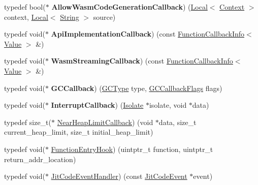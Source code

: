 \begin{DoxyCompactItemize}
typedef bool($\ast$ {\bfseries Allow\+Wasm\+Code\+Generation\+Callback}) (\mbox{\hyperlink{classv8_1_1Local}{Local}}$<$ \mbox{\hyperlink{classv8_1_1Context}{Context}} $>$ context, \mbox{\hyperlink{classv8_1_1Local}{Local}}$<$ \mbox{\hyperlink{classv8_1_1String}{String}} $>$ source)
\item 
\mbox{\label{namespacev8_aba0496b8f6f90db40d84055f2ee37733}} 
typedef void($\ast$ {\bfseries Api\+Implementation\+Callback}) (const \mbox{\hyperlink{classv8_1_1FunctionCallbackInfo}{Function\+Callback\+Info}}$<$ \mbox{\hyperlink{classv8_1_1Value}{Value}} $>$ \&)
\item 
\mbox{\label{namespacev8_a6354789576235038d53c101c866af3c1}} 
typedef void($\ast$ {\bfseries Wasm\+Streaming\+Callback}) (const \mbox{\hyperlink{classv8_1_1FunctionCallbackInfo}{Function\+Callback\+Info}}$<$ \mbox{\hyperlink{classv8_1_1Value}{Value}} $>$ \&)
\item 
\mbox{\label{namespacev8_aa789d9f0935eb32c27ec05e0f818a6c4}} 
typedef void($\ast$ {\bfseries G\+C\+Callback}) (\mbox{\hyperlink{namespacev8_ac109d6f27e0c0f9ef4e98bcf7a806cf2}{G\+C\+Type}} type, \mbox{\hyperlink{namespacev8_a247c37a849f4d6c293b9b16e94e1944b}{G\+C\+Callback\+Flags}} flags)
\item 
\mbox{\label{namespacev8_af07fcf2ef61237b7ba67242700b6a875}} 
typedef void($\ast$ {\bfseries Interrupt\+Callback}) (\mbox{\hyperlink{classv8_1_1Isolate}{Isolate}} $\ast$isolate, void $\ast$data)
\item 
typedef size\+\_\+t($\ast$ \mbox{\hyperlink{namespacev8_af4357cae607e45cd9e9c4fda1cc03218}{Near\+Heap\+Limit\+Callback}}) (void $\ast$data, size\+\_\+t current\+\_\+heap\+\_\+limit, size\+\_\+t initial\+\_\+heap\+\_\+limit)
\item 
typedef void($\ast$ \mbox{\hyperlink{namespacev8_aaf07fb6bb13f295da3c6568938b7dec5}{Function\+Entry\+Hook}}) (uintptr\+\_\+t function, uintptr\+\_\+t return\+\_\+addr\+\_\+location)
\item 
typedef void($\ast$ \mbox{\hyperlink{namespacev8_a39243bc91e63d64d111452fdb98c4733}{Jit\+Code\+Event\+Handler}}) (const \mbox{\hyperlink{structv8_1_1JitCodeEvent}{Jit\+Code\+Event}} $\ast$event)
\item 
\mbox{\label{namespacev8_a2f1657c607b3bd0f5be53b45a5af49e3}} 

\end{DoxyCompactItemize}
